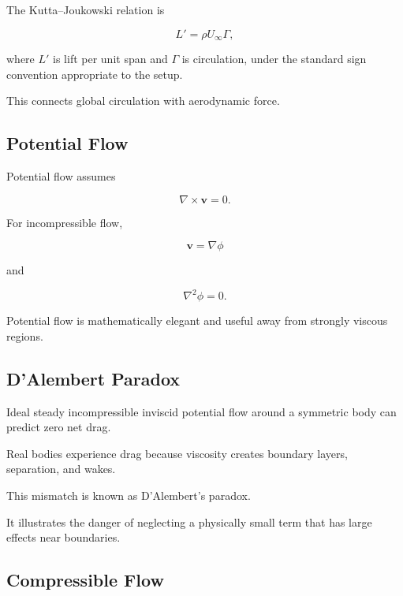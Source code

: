 The Kutta--Joukowski relation is

\[
\boxed{
L'
=
\rho U_\infty\Gamma,
}
\]

where \(L'\) is lift per unit span and \(\Gamma\) is circulation, under the
standard sign convention appropriate to the setup.

This connects global circulation with aerodynamic force.

\subsection{Potential Flow}
\label{subsec:potential-flow}

Potential flow assumes

\[
\boxed{
\nabla\times\mathbf{v}=0.
}
\]

For incompressible flow,

\[
\mathbf{v}
=
\nabla\phi
\]

and

\[
\boxed{
\nabla^2\phi=0.
}
\]

Potential flow is mathematically elegant and useful away from strongly
viscous regions.

\subsection{D'Alembert Paradox}
\label{subsec:dalembert-paradox}

Ideal steady incompressible inviscid potential flow around a symmetric body
can predict zero net drag.

Real bodies experience drag because viscosity creates boundary layers,
separation, and wakes.

This mismatch is known as D'Alembert's paradox.

It illustrates the danger of neglecting a physically small term that has
large effects near boundaries.

\subsection{Compressible Flow}
\label{subsec:compressible-flow}

